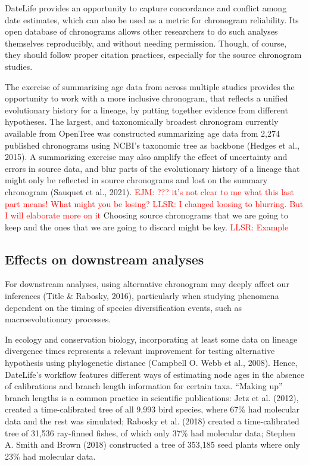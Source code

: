 \documentclass[
  english,
  man]{apa6}
\begin{document}
DateLife provides an opportunity to capture concordance and conflict among date estimates, which can also be used as a metric for chronogram reliability.
Its open database of chronograms allows other researchers to do such analyses themselves reproducibly, and without needing permission. Though, of course, they should follow proper citation practices, especially for the source chronogram studies.

The exercise of summarizing age data from across multiple studies provides the opportunity to work with a more inclusive chronogram,
that reflects a unified evolutionary history for a lineage, by putting together evidence from different hypotheses.
The largest, and taxonomically broadest chronogram currently available from OpenTree was constructed summarizing age data from 2,274 published chronograms using NCBI's taxonomic tree as backbone (Hedges et al., 2015).
A summarizing exercise may also amplify the effect of uncertainty and errors in source data, and blur parts of the evolutionary history of a lineage that might only be reflected in source chronograms and lost on the summary chronogram (Sauquet et al., 2021).
\textcolor{red}{EJM: ??? it's not clear to me what this last part means! What might you be losing?
LLSR: I changed loosing to blurring. But I will elaborate more on it}
Choosing source chronograms that we are going to keep and the ones that we are going to discard might be key.
\textcolor{red}{LLSR: Example}

\hypertarget{effects-on-downstream-analyses}{%
\subsection{Effects on downstream analyses}\label{effects-on-downstream-analyses}}

For downstream analyses, using alternative chronogram may deeply affect our inferences (Title \& Rabosky, 2016), particularly when studying phenomena dependent on the timing of species diversification events, such as macroevolutionary processes.

In ecology and conservation biology, incorporating at least some data on lineage divergence times represents a relevant improvement for testing alternative hypothesis using phylogenetic distance (Campbell O. Webb et al., 2008).
Hence, DateLife's workflow features different ways of estimating node ages in the absence of calibrations and branch length information for certain taxa.
``Making up'' branch lengths is a common practice in scientific publications: Jetz et al. (2012), created a time-calibrated tree of all 9,993 bird species, where 67\% had molecular data and the rest was simulated; Rabosky et al. (2018) created a time-calibrated tree of 31,536 ray-finned fishes, of which only 37\% had molecular data; Stephen A. Smith and Brown (2018) constructed a tree of 353,185 seed plants where only 23\% had molecular data.
\end{document}
